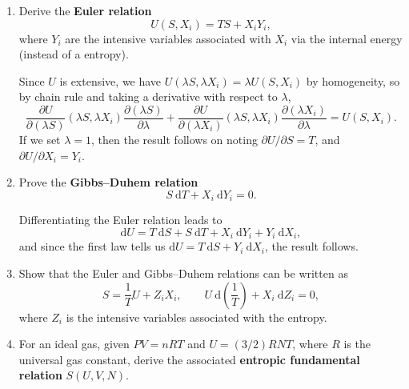 \documentclass[letter-paper]{tufte-book}
\newcommand\Def[1]{\textbf{#1}}
\begin{document}
\begin{enumerate}
  \item Derive the \Def{Euler relation}
  \begin{equation}
    U(S, X_i) = TS + X_i Y_i,
  \end{equation}
  where $Y_i$ are the intensive variables associated with $X_i$ via the internal
  energy (instead of a entropy).

  Since $U$ is extensive, we have $U(\lambda S, \lambda X_i) = \lambda U(S,
  X_i)$ by homogeneity, so by chain rule and taking a derivative with respect to
  $\lambda$,
  \begin{equation*}
    \frac{\partial U}{\partial (\lambda S)}(\lambda S, \lambda X_i) \frac{\partial (\lambda S)}{\partial \lambda} + \frac{\partial U}{\partial (\lambda X_i)}(\lambda S, \lambda X_i) \frac{\partial (\lambda X_i)}{\partial \lambda} = U(S, X_i).
  \end{equation*}
  If we set $\lambda = 1$, then the result follows on noting $\partial U /
  \partial S = T$, and $\partial U / \partial X_i = Y_i$.

  \item Prove the \Def{Gibbs--Duhem relation}
  \begin{equation}
    S\ \mathrm{d}T + X_i\ \mathrm{d}Y_i = 0.
  \end{equation}

  Differentiating the Euler relation leads to
  \begin{equation*}
    \mathrm{d}U = T\ \mathrm{d}S + S\ \mathrm{d}T + X_i\ \mathrm{d}Y_i + Y_i\ \mathrm{d}X_i,
  \end{equation*}
  and since the first law tells us $\mathrm{d}U = T\ \mathrm{d}S + Y_i\
\mathrm{d}X_i$, the result follows.

  \item Show that the Euler and Gibbs--Duhem relations can be written as
  \begin{equation*}
    S = \frac{1}{T} U + Z_i X_i, \qquad U\ \mathrm{d}\left(\frac{1}{T}\right) + X_i\ \mathrm{d}Z_i = 0,
  \end{equation*}
  where $Z_i$ is the intensive variables associated with the entropy.
  
  \item For an ideal gas, given $PV = nRT$ and $U = (3/2)RNT$, where $R$ is the
  universal gas constant, derive the associated \Def{entropic fundamental
  relation} $S(U,V,N)$.

\end{enumerate}

\end{document}
